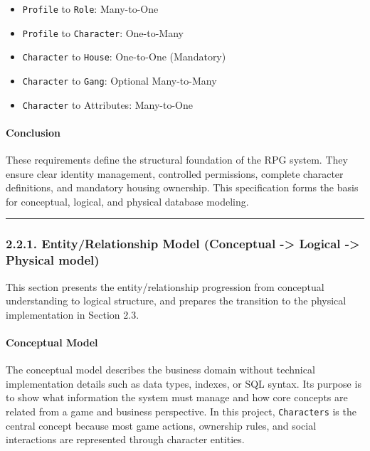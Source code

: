 \begin{itemize}
\tightlist
\item
  \texttt{Profile} to \texttt{Role}: Many-to-One
\item
  \texttt{Profile} to \texttt{Character}: One-to-Many
\item
  \texttt{Character} to \texttt{House}: One-to-One (Mandatory)
\item
  \texttt{Character} to \texttt{Gang}: Optional Many-to-Many
\item
  \texttt{Character} to Attributes: Many-to-One
\end{itemize}

\hypertarget{conclusion}{%
\paragraph{Conclusion}\label{conclusion}}

These requirements define the structural foundation of the RPG system.
They ensure clear identity management, controlled permissions, complete
character definitions, and mandatory housing ownership. This
specification forms the basis for conceptual, logical, and physical
database modeling.

\begin{center}\rule{0.5\linewidth}{0.5pt}\end{center}

\newpage

\hypertarget{entityrelationship-model-conceptual---logical---physical-model}{%
\subsubsection{2.2.1. Entity/Relationship Model (Conceptual
-\textgreater{} Logical -\textgreater{} Physical
model)}\label{entityrelationship-model-conceptual---logical---physical-model}}

This section presents the entity/relationship progression from
conceptual understanding to logical structure, and prepares the
transition to the physical implementation in Section 2.3.

\hypertarget{conceptual-model}{%
\paragraph{Conceptual Model}\label{conceptual-model}}

The conceptual model describes the business domain without technical
implementation details such as data types, indexes, or SQL syntax. Its
purpose is to show what information the system must manage and how core
concepts are related from a game and business perspective. In this
project, \texttt{Characters} is the central concept because most game
actions, ownership rules, and social interactions are represented
through character entities.

